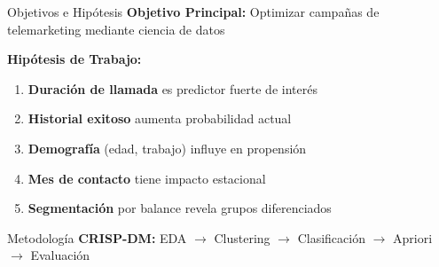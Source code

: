 \documentclass[10pt]{beamer}
\begin{document}
\begin{frame}{Objetivos e Hipótesis}
    \textbf{Objetivo Principal:} Optimizar campañas de telemarketing mediante ciencia de datos
    
    \vspace{0.4cm}
    \textbf{Hipótesis de Trabajo:}
    \begin{enumerate}
        \item[\textcolor{mGreen}{\textbf{H1}}] \textbf{Duración de llamada} es predictor fuerte de interés
        \item[\textcolor{mGreen}{\textbf{H2}}] \textbf{Historial exitoso} aumenta probabilidad actual
        \item[\textcolor{mGreen}{\textbf{H3}}] \textbf{Demografía} (edad, trabajo) influye en propensión
        \item[\textcolor{mOrange}{\textbf{H4}}] \textbf{Mes de contacto} tiene impacto estacional
        \item[\textcolor{mGreen}{\textbf{H5}}] \textbf{Segmentación} por balance revela grupos diferenciados
    \end{enumerate}
    
    \vspace{0.3cm}
    \begin{alertblock}{Metodología}
        \textbf{CRISP-DM:} EDA $\rightarrow$ Clustering $\rightarrow$ Clasificación $\rightarrow$ Apriori $\rightarrow$ Evaluación
    \end{alertblock}
\end{frame}
\end{document}
